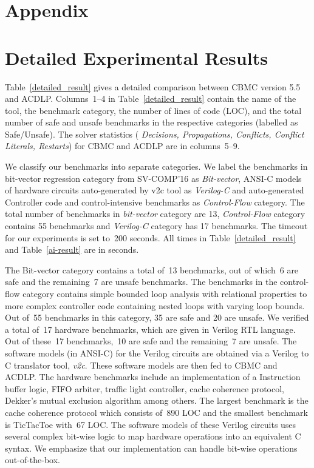 \appendix
\section*{Appendix}
%
\section{Detailed Experimental Results}\label{appendix:extended_result}
Table~\ref{detailed_result} gives a detailed comparison between CBMC version
5.5 and ACDLP.  Columns~1--4 in Table~\ref{detailed_result} contain the
name of the tool, the benchmark category, the number of lines of code (LOC),
and the total number of safe and unsafe benchmarks in the respective
categories (labelled as Safe/Unsafe).  The solver statistics ({\em
Decisions, Propagations, Conflicts, Conflict Literals, Restarts}) 
for CBMC and ACDLP are in columns~5--9.
%

We classify our benchmarks into separate categories. 
We label the benchmarks in bit-vector regression category from SV-COMP'16 
as {\em Bit-vector}, ANSI-C models of hardware circuits auto-generated by v2c 
tool as {\em Verilog-C} and auto-generated Controller code and control-intensive 
benchmarks as {\em Control-Flow} category.  The total number of benchmarks in 
{\em bit-vector} category are 13, {\em Control-Flow} category contains 
55 benchmarks and {\em Verilog-C} category has 17 benchmarks. The timeout for 
our experiments is set to~200 seconds.  All times in Table~\ref{detailed_result} 
and Table~\ref{ai-result} are in seconds. 

The Bit-vector category contains a total of~13 benchmarks, out of which~6
are safe and the remaining~7 are unsafe benchmarks.  The benchmarks in the
control-flow category contains simple bounded loop analysis with relational
properties to more complex controller code containing nested loops with
varying loop bounds.  Out of~55 benchmarks in this category, 35 are safe and
20 are unsafe.  We verified a total of~17 hardware benchmarks, which are
given in Verilog RTL language.  Out of these~17 benchmarks,~10 are safe and
the remaining~7 are unsafe.  The software models (in ANSI-C) for the Verilog
circuits are obtained via a Verilog to C translator tool, {\em v2c}.  These
software models are then fed to CBMC and ACDLP.  The hardware benchmarks
include an implementation of a Instruction buffer logic, FIFO arbiter,
traffic light controller, cache coherence protocol, Dekker's mutual
exclusion algorithm among others.  The largest benchmark is the cache
coherence protocol which consists of~890 LOC and the smallest benchmark is
TicTacToe with~67 LOC.  The software models of these Verilog circuits uses
several complex bit-wise logic to map hardware operations into an equivalent
C syntax.  We emphasize that our implementation can handle bit-wise
operations out-of-the-box.


